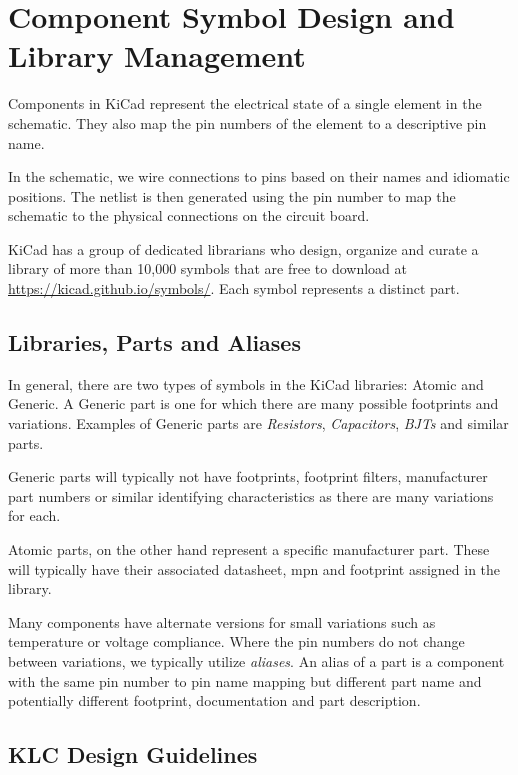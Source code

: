 
\chapter{Component Symbol Design and Library Management}

Components in KiCad represent the electrical state of a single element in the schematic.
They also map the pin numbers of the element to a descriptive pin name.

In the schematic, we wire connections to pins based on their names and idiomatic positions.
The netlist is then generated using the pin number to map the schematic to the physical connections on the circuit board.

KiCad has a group of dedicated librarians who design, organize and curate a library of more than 10,000 symbols that are free to download at \url{https://kicad.github.io/symbols/}.  
Each symbol represents a distinct part.

\section{Libraries, Parts and Aliases}

In general, there are two types of symbols in the KiCad libraries: Atomic and Generic.
A Generic part is one for which there are many possible footprints and variations.
Examples of Generic parts are \textit{Resistors}, \textit{Capacitors}, \textit{BJTs} and similar parts.

Generic parts will typically not have footprints, footprint filters, manufacturer part numbers or similar identifying characteristics as there are many variations for each.

Atomic parts, on the other hand represent a specific manufacturer part.
These will typically have their associated datasheet, mpn and footprint assigned in the library.

Many components have alternate versions for small variations such as temperature or voltage compliance.
Where the pin numbers do not change between variations, we typically utilize \textit{aliases}.
An alias of a part is a component with the same pin number to pin name mapping but different part name and potentially different footprint, documentation and part description.

\section{KLC Design Guidelines}


